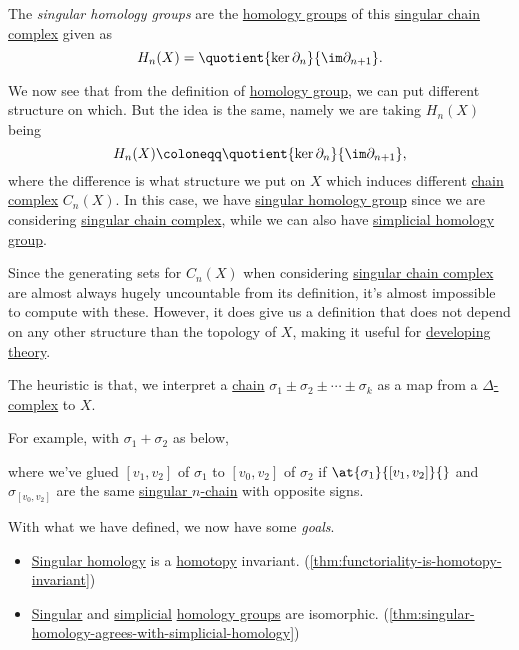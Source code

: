\begin{definition}\label{def:singular-homology-group}
	The \emph{singular homology groups} are the \hyperref[def:homology-group]{homology groups} of this \hyperref[def:singular-chain]{singular chain complex} given as
	\[
		H_n(X) = \quotient{\ker \partial_n}{\im \partial_{n + 1}}.
	\]
\end{definition}
\begin{remark}
	We now see that from the definition of \hyperref[def:homology-group]{homology group}, we can put different structure on which.
	But the idea is the same, namely we are taking \(H_{n} (X)\) being
	\[
		H_n(X) \coloneqq \quotient{\ker \partial _n}{\im \partial _{n+1}},
	\]
	where the difference is what structure we put on \(X\) which induces different \hyperref[def:chain-complex]{chain complex} \(C_{n} (X)\).
	In this case, we have \hyperref[def:singular-homology-group]{singular homology group} since we are considering
	\hyperref[def:singular-chain-complex]{singular chain complex}, while we can also have
	\hyperref[def:simplicial-homology-group]{simplicial homology group}.
\end{remark}

Since the generating sets for \(C_{n} (X)\) when considering \hyperref[def:singular-chain-complex]{singular chain complex} are almost
always hugely uncountable from its definition, it's almost impossible to compute with these. However, it does give us a definition
that does not depend on any other structure than the topology of \(X\), making it useful for \underline{developing theory}.

\begin{note}
	The heuristic is that, we interpret a \hyperref[def:chain-complex]{chain} \(\sigma_1 \pm \sigma_2 \pm \cdots \pm \sigma_k\) as a
	map from a \hyperref[def:delta-complex]{\(\Delta\)-complex} to \(X\).

	\par For example, with \(\sigma_1 + \sigma_2\) as below,
	\begin{figure}[H]
		\centering
		\label{fig:note:chain-as-a-map}
	\end{figure}
	where we've glued \([v_1, v_2]\) of \(\sigma_1\) to \([v_0, v_2]\) of \(\sigma_2\) if \(\at{\sigma_1}{[v_1, v_2]}{}\) and
	\(\sigma_{[v_0, v_2]}\) are the same \hyperref[def:singular-chain]{singular \(n\)-chain} with opposite signs.
\end{note}

With what we have defined, we now have some \emph{goals}.
\begin{itemize}
	\item \hyperref[def:singular-homology-group]{Singular homology} is a \hyperref[def:homotopy]{homotopy} invariant. (\autoref{thm:functoriality-is-homotopy-invariant})
	\item \hyperref[def:singular-homology-group]{Singular} and \hyperref[def:simplicial-homology-group]{simplicial} \hyperref[def:homology-group]{homology groups} are isomorphic. (\autoref{thm:singular-homology-agrees-with-simplicial-homology})
\end{itemize}

